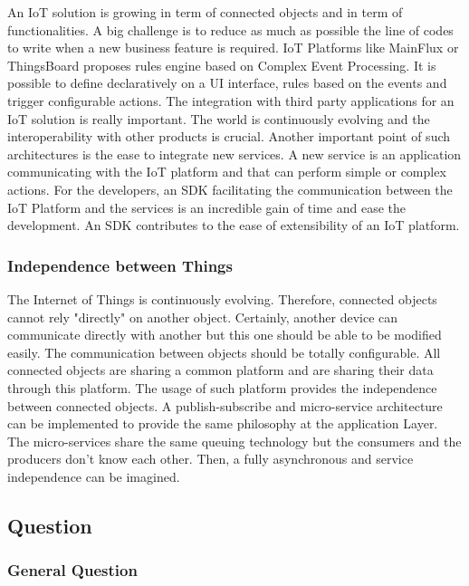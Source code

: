 \documentclass[11pt]{article}
\begin{document}
An IoT solution is growing in term of connected objects and in term of functionalities. A big challenge is to reduce as much as possible the line of codes to write when a new business feature is required. IoT Platforms like MainFlux \cite{Unified-IoT-Platform-Architecture} or ThingsBoard proposes rules engine based on Complex Event Processing. It is possible to define declaratively on a UI interface, rules based on the events and trigger configurable actions. \cite{Performance-Evaluation-Of-Open-Source-IoT-Platforms} The integration with third party applications for an IoT solution is really important. The world is continuously evolving and the interoperability with other products is crucial. 
\newline
\newline
Another important point of such architectures is the ease to integrate new services. A new service is an application communicating with the IoT platform and that can perform simple or complex actions. For the developers, an SDK facilitating the communication between the IoT Platform and the services is an incredible gain of time and ease the development. An SDK contributes to the ease of extensibility of an IoT platform. 

\subsubsection{Independence between Things}

The Internet of Things is continuously evolving. Therefore, connected objects cannot rely "directly" on another object. Certainly, another device can communicate directly with another but this one should be able to be modified easily. The communication between objects should be totally configurable. All connected objects are sharing a common platform and are sharing their data through this platform. The usage of such platform provides the independence between connected objects. A publish-subscribe and micro-service architecture can be implemented to provide the same philosophy at the application Layer. The micro-services share the same queuing technology but the consumers and the producers don't know each other. Then, a fully asynchronous and service independence can be imagined.

\subsection{Question}

\subsubsection{General Question}
\end{document}
